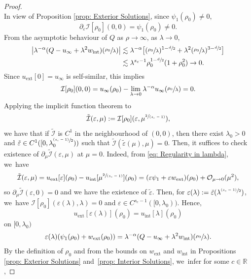 \documentclass[10pt]{amsart}
\newcommand{\psfrac}[2]{\sfrac{(#1)}{#2}}
\newcommand{\spfrac}[2]{\sfrac{#1}{(#2)}}
\theoremstyle{plain}
\theoremstyle{definition}
\DeclareMathOperator{\exterior}{ext}
\DeclareMathOperator{\interior}{int}
\begin{document}
\begin{proof}
\[\]
In view of Proposition \ref{prop: Exterior Solutions}, since $\psi_1(\rho_0)\neq 0$,
\[
\partial_\varepsilon \mathcal I[\rho_0](0,0)=\psi_1(\rho_0)\neq 0.
\]
From the asymptotic behaviour of $Q$ as $\rho\to\infty$, as $\lambda\to 0$,
\begin{equation}
\label{eq: Regularity in lambda}
\begin{aligned}
\big|\lambda^{-\alpha}(Q-u_\infty+\lambda^2 w_{\interior})(\sfrac{\rho_0}{\lambda})\big|
&\lesssim\lambda^{-\alpha}\big[(\sfrac{\rho_0}{\lambda})^{1-\sfrac{d}{2}}+\lambda^2(\sfrac{\rho_0}{\lambda})^{3-\sfrac{d}{2}}\big]\\
&\lesssim \lambda^{s_c-1}\rho_0^{1-\sfrac{d}{2}}(1+\rho_0^2)\to 0.
\end{aligned}
\end{equation}
Since $u_{\exterior}[0]=u_\infty$ is self-similar, this implies
\[
\mathcal I[\rho_0](0,0)=u_\infty (\rho_0)-\lim_{\lambda\to 0} \lambda^{-\alpha}u_\infty(\sfrac{\rho_0}{\lambda})=0.
\]
Applying the implicit function theorem to
\[
\tilde{\mathcal I}(\varepsilon, \mu):=\mathcal I[\rho_0](\varepsilon,\mu^{\spfrac{2}{s_c-1}}),
\]
we have that if $\tilde{\mathcal I}$ is $C^1$ in the neighbourhood of $(0,0)$, then there exist $\lambda_0>0$ and $\tilde \varepsilon \in C^1([0,\lambda_0^{\psfrac{s_c-1}{2}}))$ such that $\tilde{\mathcal I} (\tilde\varepsilon(\mu),\mu)=0$. Then, it suffices to check existence of $\partial _\mu \tilde{\mathcal I} (\varepsilon,\mu)$ at $\mu=0$. Indeed, from \eqref{eq: Regularity in lambda}, we~have
\[
\tilde{\mathcal I}(\varepsilon, \mu)=u_{\exterior}[\varepsilon](\rho_0)-u_{\interior}[\mu^{\spfrac{2}{s_c-1}}](\rho_0)=(\varepsilon \psi_1+\varepsilon w_{\exterior})(\rho_0)+\mathcal O_{\mu\to0}(\mu^2),
\]
so $\partial _\mu \tilde{\mathcal I} (\varepsilon,0)=0$ and we have the existence of $\tilde \varepsilon$. Then, for $\varepsilon(\lambda):=\tilde \varepsilon (\lambda^{\psfrac{s_c-1}{2}})$, we~have $\mathcal I[\rho_0](\varepsilon(\lambda),\lambda)=0$ and $\varepsilon\in C^{s_c-1}([0,\lambda_0))$. Hence,
\[
u_{\exterior}[\varepsilon(\lambda)](\rho_0)=u_{\interior}[\lambda](\rho_0)
\]
on $[0,\lambda_0)$ \ie
\begin{equation}
\label{eq: Matching}
\varepsilon(\lambda)(\psi_1(\rho_0)+w_{\exterior}(\rho_0))=\lambda^{-\alpha}(Q-u_\infty+\lambda^2w_{\interior})(\sfrac{\rho_0}{\lambda}).
\end{equation}
By the definition of $\rho_0$ and from the bounds on $w_{\exterior}$ and $w_{\interior}$ in Propositions \ref{prop: Exterior Solutions} and~\ref{prop: Interior Solutions}, we~infer for some $c\in \mathbb R$,

\end{proof}
\end{document}
